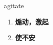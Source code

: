 
\begin{frame}
{\huge agitate}
\begin{center}
\begin{enumerate}\Large
  \item \textbf{煽动，激起}
  \item \textbf{使不安}
\end{enumerate}
\end{center}
\end{frame}
